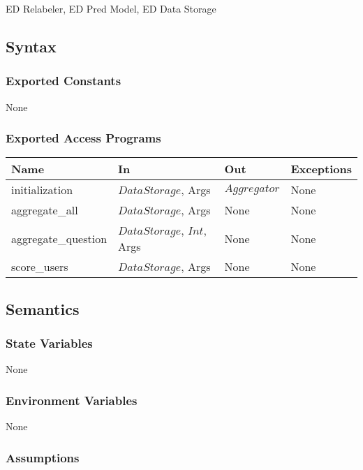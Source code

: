 \documentclass[12pt, titlepage]{article}
\begin{document}
ED Relabeler, ED Pred Model, ED Data Storage

\subsection{Syntax}

\subsubsection{Exported Constants}

None

\subsubsection{Exported Access Programs}

\begin{center}
\begin{tabular}{p{3cm} p{5cm} p{3cm} p{3cm}}
\hline
\textbf{Name} & \textbf{In} & \textbf{Out} & \textbf{Exceptions} \\
\hline
initialization & $DataStorage$, Args & $Aggregator$ & None \\
aggregate\_all & $DataStorage$, Args & None & None \\
aggregate\_question & $DataStorage$, $Int$, Args & None & None \\
score\_users & $DataStorage$, Args & None & None \\
\hline
\end{tabular}
\end{center}

\subsection{Semantics}

\subsubsection{State Variables}

None

\subsubsection{Environment Variables}

None

\subsubsection{Assumptions}
\end{document}

